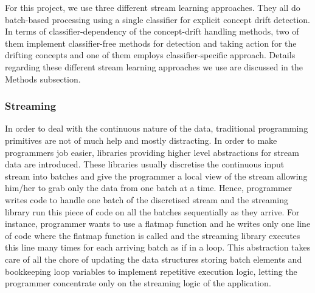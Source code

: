 \documentclass{article} %
\begin{document}
For this project, we use three different stream learning approaches. They all do batch-based processing using a single classifier for explicit concept drift detection. In terms of classifier-dependency of the concept-drift handling methods, two of them implement classifier-free methods for detection and taking action for the drifting concepts and one of them employs classifier-specific approach. Details regarding these different stream learning approaches we use are discussed in the Methods subsection.


\subsubsection{Streaming}
In order to deal with the continuous nature of the data, traditional programming primitives are not of much help and mostly distracting. In order to make programmers job easier, libraries providing higher level abstractions for stream data are introduced. These libraries usually discretise the continuous input stream into batches and give the programmer a local view of the stream allowing him/her to grab only the data from one batch at a time. Hence, programmer writes code to handle one batch of the discretised stream and the streaming library run this piece of code on all the batches sequentially as they arrive. For instance, programmer wants to use a flatmap function and he writes only one line of code where the flatmap function is called and the streaming library executes this line many times for each arriving batch as if in a loop. This abstraction takes care of all the chore of updating the data structures storing batch elements and bookkeeping loop variables to implement repetitive execution logic, letting the programmer concentrate only on the streaming logic of the application. 
\end{document}
